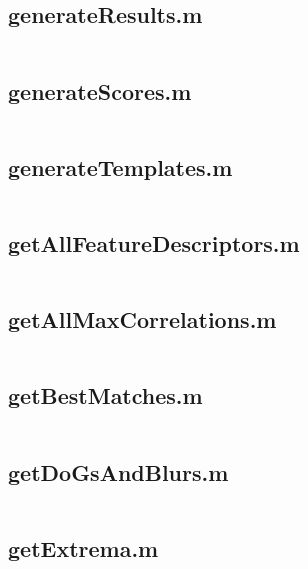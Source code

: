 \documentclass[11pt]{article}
\begin{document}
\begin{appendices}
\subsection*{generateResults.m}
\label{sec:generateResults.m}
\inputminted[breaklines=true,breakanywhere=true,fontsize=\small]{matlab}{../src/generateResults.m}

\subsection*{generateScores.m}
\label{sec:generateScores.m}
\inputminted[breaklines=true,breakanywhere=true,fontsize=\small]{matlab}{../src/generateScores.m}

\subsection*{generateTemplates.m}
\label{sec:generateTemplates.m}
\inputminted[breaklines=true,breakanywhere=true,fontsize=\small]{matlab}{../src/generateTemplates.m}

\subsection*{getAllFeatureDescriptors.m}
\label{sec:getAllFeatureDescriptors.m}
\inputminted[breaklines=true,breakanywhere=true,fontsize=\small]{matlab}{../src/getAllFeatureDescriptors.m}

\subsection*{getAllMaxCorrelations.m}
\label{sec:getAllMaxCorrelations.m}
\inputminted[breaklines=true,breakanywhere=true,fontsize=\small]{matlab}{../src/getAllMaxCorrelations.m}

\subsection*{getBestMatches.m}
\label{sec:getBestMatches.m}
\inputminted[breaklines=true,breakanywhere=true,fontsize=\small]{matlab}{../src/getBestMatches.m}

\subsection*{getDoGsAndBlurs.m}
\label{sec:getDoGsAndBlurs.m}
\inputminted[breaklines=true,breakanywhere=true,fontsize=\small]{matlab}{../src/getDoGsAndBlurs.m}

\subsection*{getExtrema.m}
\label{sec:getExtrema.m}
\inputminted[breaklines=true,breakanywhere=true,fontsize=\small]{matlab}{../src/getExtrema.m}


\end{appendices}
\end{document}
